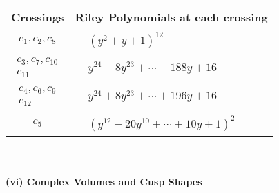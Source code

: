 \documentclass[1p]{elsarticle_modified}
\theoremstyle{definition}
\begin{document}
\begin{tabular}{m{50pt}|m{274pt}}
Crossings & \hspace{64pt}Riley Polynomials at each crossing \\
\hline $$\begin{aligned}c_{1},c_{2},c_{8}\end{aligned}$$&$\begin{aligned}
&(y^2+y+1)^{12}
\end{aligned}$\\
\hline $$\begin{aligned}c_{3},c_{7},c_{10}\\c_{11}\end{aligned}$$&$\begin{aligned}
&y^{24}-8 y^{23}+\cdots-188 y+16
\end{aligned}$\\
\hline $$\begin{aligned}c_{4},c_{6},c_{9}\\c_{12}\end{aligned}$$&$\begin{aligned}
&y^{24}+8 y^{23}+\cdots+196 y+16
\end{aligned}$\\
\hline $$\begin{aligned}c_{5}\end{aligned}$$&$\begin{aligned}
&(y^{12}-20 y^{10}+\cdots+10 y+1)^{2}
\end{aligned}$\\
\hline
\end{tabular}\\~\\
\newpage\flushleft \textbf{(vi) Complex Volumes and Cusp Shapes}
\end{document}
